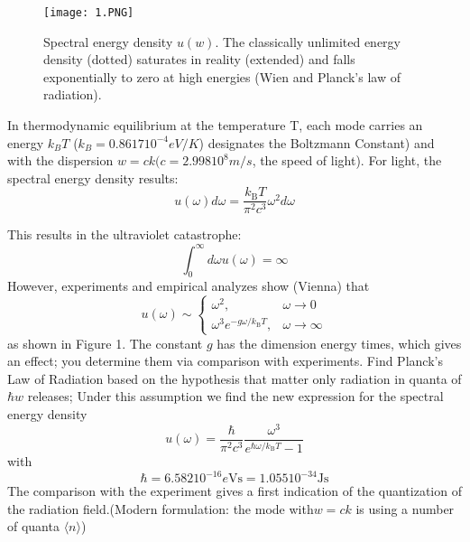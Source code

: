 \begin{figure}[ht]
    \centering
    \texttt{[image: 1.PNG]}
    \caption{Spectral energy density $u(w)$. The classically unlimited energy density (dotted) saturates in reality (extended) and falls exponentially to zero at high energies (Wien and Planck's law of radiation).}
    \label{fig:1}
\end{figure}
In thermodynamic equilibrium at the temperature T, each mode carries an energy $k_BT$ ($k_B = 0.8617 10^{-4} eV/K$) designates the Boltzmann
Constant) and with the dispersion $w = ck (c = 2.998 10^8 m/s$, the speed of light). For light, the spectral energy density results:
\\\begin{equation}
u(\omega) d \omega=\frac{k_{\mathrm{B}} T}{\pi^{2} c^{3}} \omega^{2} d \omega
\end{equation}

This results in the ultraviolet catastrophe:
\begin{equation}
\int_{0}^{\infty} d \omega u(\omega)=\infty
\end{equation}
However, experiments and empirical analyzes show (Vienna) that
\begin{equation}
u(\omega) \sim\left\{\begin{array}{ll}{\omega^{2},} & {\omega \rightarrow 0} \\ {\omega^{3} e^{-g \omega / k_{\mathrm{B}} T},} & {\omega \rightarrow \infty}\end{array}\right.
\end{equation}
as shown in Figure 1. The constant $g$ has the dimension energy times, which gives an effect; you determine them via comparison with experiments. Find Planck's Law of Radiation based on the hypothesis that matter only radiation in quanta of $\hbar w$ releases;
Under this assumption we find the new expression for the spectral energy density
\begin{equation}
u(\omega)=\frac{\hbar}{\pi^{2} c^{3}} \frac{\omega^{3}}{e^{\hbar \omega / k_{\mathrm{B}} T}-1}
\end{equation}
with
\begin{equation}
 \hbar=6.58210^{-16} e \mathrm{Vs}=1.05510^{-34} \mathrm{Js}
\end{equation}
The comparison with the experiment gives a first indication of the quantization of the radiation field.(Modern formulation: the mode with$w = ck$ is using a number of quanta $\langle n\rangle$)


